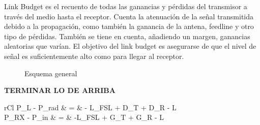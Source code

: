 \documentclass[10pt,portrait, twocolumn]{article}
\begin{document}
Link Budget es el recuento de todas las ganancias y pérdidas del transmisor a través del medio hasta el receptor. Cuenta la atenuación de la señal transmitida debido a la propagación, como también la ganancia de la antena, feedline y otro tipo de pérdidas. También se tiene en cuenta, añadiendo un margen, ganancias aleatorias que varían. El objetivo del link budget es asegurarse de que el nivel de señal es suficientemente alto como para llegar al receptor.

\begin{figure}[h]
	\centering
      \caption{Esquema general}
  \end{figure}
  
  \textbf{TERMINAR LO DE ARRIBA}

	\begin{IEEEeqnarray*}{rCl}
		P_{L} - P_{rad} & = & - L_{FSL} + D_{T} + D_{R} - L \\
		P_{RX} - P_{in} & = & -L_{FSL} + G_{T} + G_{R} - L
	\end{IEEEeqnarray*}
	
\end{document}
